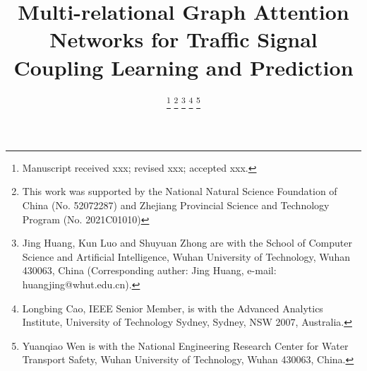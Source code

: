 \documentclass[journal]{IEEEtran}
\begin{document}
\title{Multi-relational Graph Attention Networks for Traffic Signal Coupling Learning and Prediction}

\author{
    \thanks{Manuscript received xxx; revised xxx; accepted xxx.}
    \thanks{This work was supported by the National Natural Science Foundation of China (No. 52072287) and Zhejiang  Provincial  Science  and  Technology  Program (No. 2021C01010)}
    \thanks{Jing Huang, Kun Luo and Shuyuan Zhong are with the School of Computer Science and Artificial Intelligence, Wuhan University of Technology, Wuhan 430063, China (Corresponding auther: Jing Huang, e-mail: huangjing@whut.edu.cn).}
    \thanks{Longbing Cao, IEEE Senior Member, is with the Advanced Analytics Institute, University of Technology Sydney, Sydney, NSW 2007, Australia.}
    \thanks{Yuanqiao Wen is with the National Engineering Research Center for Water Transport Safety, Wuhan University of Technology, Wuhan 430063, China.}
}
\end{document}
